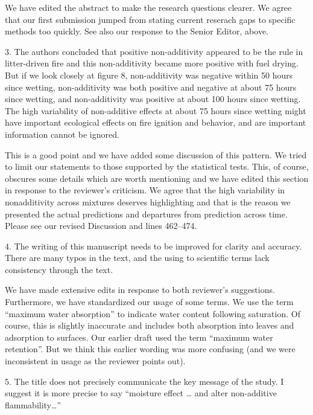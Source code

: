 \documentclass[letterpaper, 12pt]{letter}
\begin{document}
\begin{letter}{}
We have edited the abstract to make the research questions clearer. We agree
that our first submission jumped from stating current reserach gaps to specific
methods too quickly. See also our response to the Senior Editor, above.


\begin{quoting}
  3. The authors concluded that positive non-additivity appeared to be the rule
  in litter-driven fire and this non-additivity became more positive with fuel
  drying. But if we look closely at figure 8, non-additivity was negative
  within 50 hours since wetting, non-additivity was both positive and negative
  at about 75 hours since wetting, and non-additivity was positive at about 100
  hours since wetting. The high variability of non-additive effects at about 75
  hours since wetting might have important ecological effects on fire ignition
  and behavior, and are important information cannot be ignored.
\end{quoting}

This is a good point and we have added some discussion of this pattern. We
tried to limit our statements to those supported by the statistical tests.
This, of course, obscures some details which are worth mentioning and we have
edited this section in response to the reviewer's criticism. We agree that the
high variability in nonadditivity across mixtures deserves highlighting and
that is the reason we presented the actual predictions and departures from
prediction across time. Please see our revised Discussion and lines 462--474.

\begin{quoting}
  4. The writing of this manuscript needs to be improved for clarity and
  accuracy. There are many typos in the text, and the using to scientific terms
  lack consistency through the text.
\end{quoting}

We have made extensive edits in response to both reviewer's suggestions.
Furthermore, we have standardized our usage of some terms. We use the term
``maximum water absorption'' to indicate water content following saturation. Of
course, this is slightly inaccurate and includes both absorption into leaves
and adsorption to surfaces. Our earlier draft used the term ``maximum water
retention''. But we think this earlier wording was more confusing (and we were
inconsistent in usage as the reviewer points out).

\begin{quoting}
  5. The title does not precisely communicate the key message of the study. I
  suggest it is more precise to say “moisture effect … and alter non-additive
  flammability…”
\end{quoting}


\end{letter}
\end{document}
